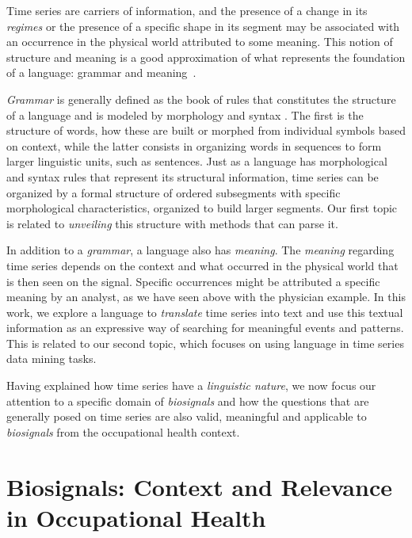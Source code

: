 Time series are carriers of information, and the presence of a change in its \textit{regimes} or the presence of a specific shape in its segment may be associated with an occurrence in the physical world attributed to some meaning. This notion of structure and meaning is a good approximation of what represents the foundation of a language: grammar and meaning~\cite{grammar}.

\textit{Grammar} is generally defined as the book of rules that constitutes the structure of a language and is modeled by morphology and syntax \cite{grammar}. The first is the structure of words, how these are built or morphed from individual symbols based on context, while the latter consists in organizing words in sequences to form larger linguistic units, such as sentences. Just as a language has morphological and syntax rules that represent its structural information, time series can be organized by a formal structure of ordered subsegments with specific morphological characteristics, organized to build larger segments. Our first topic is related to \textit{unveiling} this structure with methods that can parse it.

In addition to a \textit{grammar}, a language also has \textit{meaning}. The \textit{meaning} regarding time series depends on the context and what occurred in the physical world that is then seen on the signal. Specific occurrences might be attributed a specific meaning by an analyst, as we have seen above with the physician example. In this work, we explore a language to \textit{translate} time series into text and use this textual information as an expressive way of searching for meaningful events and patterns. This is related to our second topic, which focuses on using language in time series data mining tasks.

Having explained how time series have a \textit{linguistic nature}, we now focus our attention to a specific domain of \textit{biosignals} and how the questions that are generally posed on time series are also valid, meaningful and applicable to \textit{biosignals} from the occupational health context.

\section{Biosignals: Context and Relevance in Occupational Health} 
\label{sub:context2}

